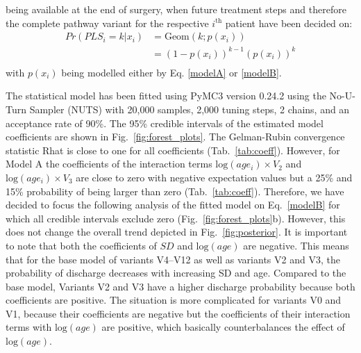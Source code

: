  being available at the end of surgery, when future treatment steps and therefore the complete pathway variant for the respective $i^\text{th}$ patient have been decided on:
\begin{equation}
\begin{split}
Pr(PLS_i=k|x_i) & = \text{Geom}\left(k;p(x_i)\right) \\
& = \left(1-p(x_i)\right)^{k-1}\left(p(x_i)\right)^{k} \\
\end{split}
\end{equation}
with $p(x_i)$ being modelled either by Eq. \eqref{modelA} or
\eqref{modelB}.
    
The statistical model has been fitted using PyMC3
\citep{Salvatier2016_PyMC3} version 0.24.2 using the No-U-Turn Sampler
(NUTS) with 20,000 samples, 2,000 tuning steps, 2 chains, and an
acceptance rate of 90\%. The 95\% credible intervals of the estimated
model coefficients are shown in Fig.~\ref{fig:forest_plots}. The
Gelman-Rubin convergence statistic Rhat is close to one for all
coefficients (Tab.~\ref{tab:coeff}). 
However, for Model A the coefficients of the interaction terms
$\text{log}(age_i)\times V_2$ and $\text{log}(age_i)\times V_3$ are
close to zero with negative expectation values but a 25\% and 15\%
probability of being larger than zero (Tab.~\ref{tab:coeff}). 
Therefore, we have decided to focus the following analysis of the
fitted model on Eq.~\eqref{modelB} for which all credible intervals
exclude zero (Fig.~\ref{fig:forest_plots}b).
However, this does not change the overall trend depicted in Fig.~\ref{fig:posterior}.
It is important to note that both the coefficients of $SD$ and $\text{log}(age)$ are negative. This means that for the base model of variants V4--V12 as well as variants V2 and V3, the probability of discharge decreases with increasing SD and age. 
Compared to the base model, Variants V2 and V3 have a higher discharge probability because both coefficients are positive. 
The situation is more complicated for variants V0 and V1, because their coefficients are negative but the coefficients of their interaction terms with $\text{log}(age)$ are positive, which basically counterbalances the effect of $\text{log}(age)$.

